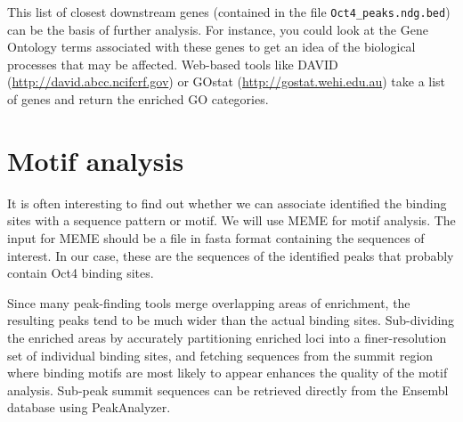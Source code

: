 \begin{note}
This list of closest downstream genes (contained in the file
\texttt{Oct4\_peaks.ndg.bed}) can be the basis of further analysis. For instance,
you could look at the Gene Ontology terms associated with these genes to get an
idea of the biological processes that may be affected. Web-based tools like
DAVID (\url{http://david.abcc.ncifcrf.gov}) or GOstat
(\url{http://gostat.wehi.edu.au}) take a list of genes and return the enriched
GO categories.
\end{note}


\section{Motif analysis}

\begin{information}
It is often interesting to find out whether we can associate identified the
binding sites with a sequence pattern or motif. We will use MEME for motif
analysis. The input for MEME should be a file in fasta format containing the
sequences of interest. In our case, these are the sequences of the identified
peaks that probably contain Oct4 binding sites.

Since many peak-finding tools merge overlapping areas of enrichment, the
resulting peaks tend to be much wider than the actual binding sites.
Sub-dividing the enriched areas by accurately partitioning enriched loci into a
finer-resolution set of individual binding sites, and fetching sequences from
the summit region where binding motifs are most likely to appear enhances the
quality of the motif analysis. Sub-peak summit sequences can be retrieved
directly from the Ensembl database using PeakAnalyzer.
\end{information}

